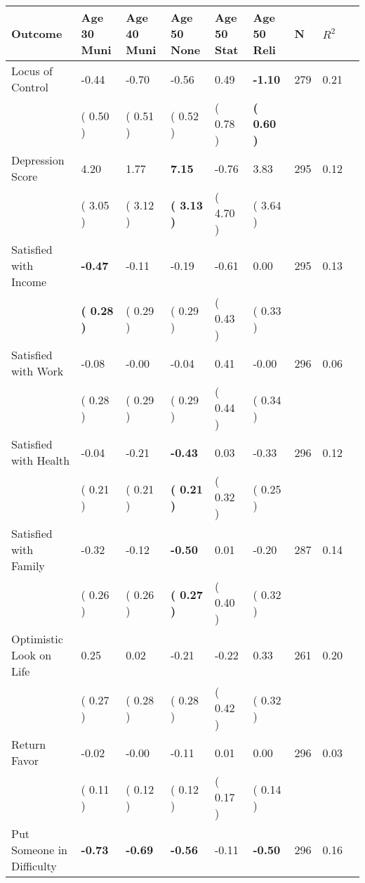 \begin{tabular}{L{6.2cm} C{1.8cm} C{1.8cm} C{1.8cm} C{1.8cm} C{1.8cm} C{1.8cm} C{0.3cm} C{0.3cm}}
\toprule
 \textbf{Outcome} & \textbf{Age 30 Muni} & \textbf{Age 40 Muni} & \textbf{Age 50 None} & \textbf{Age 50 Stat} & \textbf{Age 50 Reli} & \textbf{N} & \textbf{$ R^2$} \\
\midrule
Locus of Control &     -0.44 &     -0.70 &     -0.56 &      0.49 & \textbf{    -1.10}  & 279 &       0.21 \\ 
 & (     0.50 ) & (     0.51 ) & (     0.52 ) & (     0.78 ) & \textbf{(     0.60 )}  & \\
Depression Score &      4.20 &      1.77 & \textbf{     7.15} &     -0.76 &      3.83  & 295 &       0.12 \\ 
 & (     3.05 ) & (     3.12 ) & \textbf{(     3.13 )} & (     4.70 ) & (     3.64 )  & \\
Satisfied with Income & \textbf{    -0.47} &     -0.11 &     -0.19 &     -0.61 &      0.00  & 295 &       0.13 \\ 
 & \textbf{(     0.28 )} & (     0.29 ) & (     0.29 ) & (     0.43 ) & (     0.33 )  & \\
Satisfied with Work &     -0.08 &     -0.00 &     -0.04 &      0.41 &     -0.00  & 296 &       0.06 \\ 
 & (     0.28 ) & (     0.29 ) & (     0.29 ) & (     0.44 ) & (     0.34 )  & \\
Satisfied with Health &     -0.04 &     -0.21 & \textbf{    -0.43} &      0.03 &     -0.33  & 296 &       0.12 \\ 
 & (     0.21 ) & (     0.21 ) & \textbf{(     0.21 )} & (     0.32 ) & (     0.25 )  & \\
Satisfied with Family &     -0.32 &     -0.12 & \textbf{    -0.50} &      0.01 &     -0.20  & 287 &       0.14 \\ 
 & (     0.26 ) & (     0.26 ) & \textbf{(     0.27 )} & (     0.40 ) & (     0.32 )  & \\
Optimistic Look on Life &      0.25 &      0.02 &     -0.21 &     -0.22 &      0.33  & 261 &       0.20 \\ 
 & (     0.27 ) & (     0.28 ) & (     0.28 ) & (     0.42 ) & (     0.32 )  & \\
Return Favor &     -0.02 &     -0.00 &     -0.11 &      0.01 &      0.00  & 296 &       0.03 \\ 
 & (     0.11 ) & (     0.12 ) & (     0.12 ) & (     0.17 ) & (     0.14 )  & \\
Put Someone in Difficulty & \textbf{    -0.73} & \textbf{    -0.69} & \textbf{    -0.56} &     -0.11 & \textbf{    -0.50}  & 296 &       0.16 \\ 

\end{tabular}
